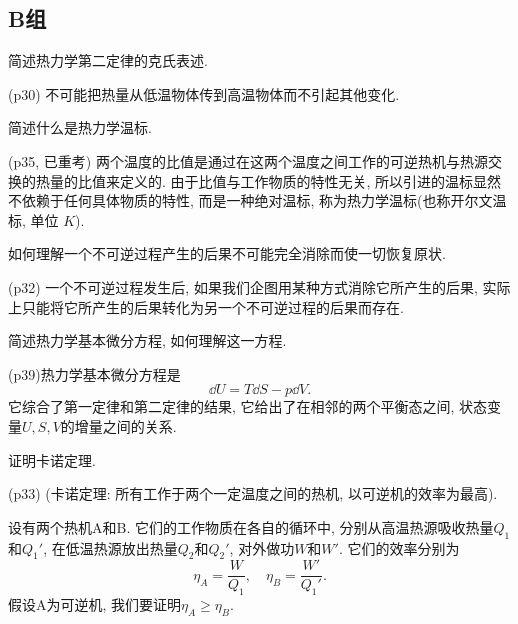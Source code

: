 \subsection{B组}
\begin{questions}
  \question 简述热力学第二定律的克氏表述.
  \begin{solution}
    (p30) 不可能把热量从低温物体传到高温物体而不引起其他变化.
  \end{solution}
  \question 简述什么是热力学温标.
  \begin{solution}
    (p35, 已重考) 两个温度的比值是通过在这两个温度之间工作的可逆热机与热源交换的热量的比值来定义的. 由于比值与工作物质的特性无关, 所以引进的温标显然不依赖于任何具体物质的特性, 而是一种绝对温标, 称为热力学温标(也称开尔文温标, 单位 $\si{K}$).
  \end{solution}
  \question 如何理解一个不可逆过程产生的后果不可能完全消除而使一切恢复原状.
  \begin{solution}
    (p32) 一个不可逆过程发生后, 如果我们企图用某种方式消除它所产生的后果, 实际上只能将它所产生的后果转化为另一个不可逆过程的后果而存在.
  \end{solution}
  \question 简述热力学基本微分方程, 如何理解这一方程.
  \begin{solution}
    (p39)热力学基本微分方程是
    \begin{equation}
      \dd U = T\dd S - p\dd V.
    \end{equation}
    它综合了第一定律和第二定律的结果, 它给出了在相邻的两个平衡态之间, 状态变量$U, S, V$的增量之间的关系.
  \end{solution}
  \question 证明卡诺定理.
  \begin{solution}
    (p33) (卡诺定理: 所有工作于两个一定温度之间的热机, 以可逆机的效率为最高).

    设有两个热机A和B. 它们的工作物质在各自的循环中, 分别从高温热源吸收热量$Q_1$和$Q_1'$, 在低温热源放出热量$Q_2$和$Q_2'$, 对外做功$W$和$W'$. 它们的效率分别为
    \begin{equation}
      \eta_A = \frac{W}{Q_1}, \quad \eta_B = \frac{W'}{Q_1'}.
    \end{equation}
    假设A为可逆机, 我们要证明$\eta_A\ge\eta_B$.


\end{solution}
\end{questions}
